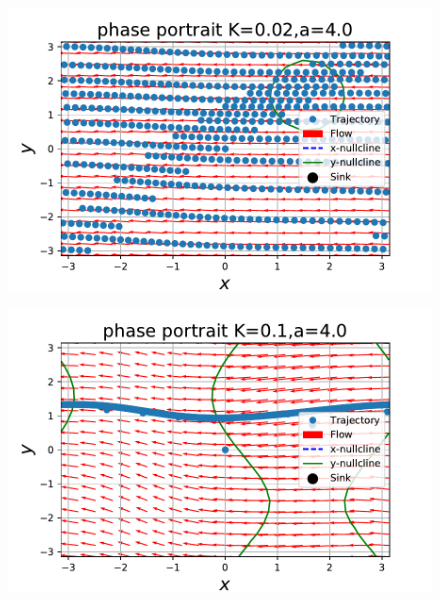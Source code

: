 \documentclass[../main]{subfiles}
\begin{document}
\captionsetup[figure]{justification=centering}
\begin{figure}[t]
    \begin{minipage}[b]{0.47\linewidth}
      \centering
      \includegraphics[keepaspectratio, scale=0.42]{images/phase_a4K2.pdf}
      \label{fig:phase-k2}
    \end{minipage}
    \begin{minipage}[b]{0.47\linewidth}
      \centering
      \includegraphics[keepaspectratio, scale=0.42]{images/phase_a4K10.pdf}
      \label{fig:phase-k10}
    \end{minipage}\\
    \begin{minipage}[b]{0.47\linewidth}

\end{minipage}
\end{figure}
\end{document}
